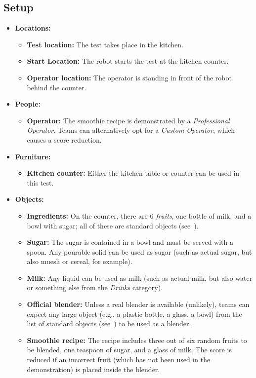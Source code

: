 \subsection*{Setup}
\begin{itemize}[nosep]
    \item \textbf{Locations:}
        \begin{itemize}
            \item \textbf{Test location:} The test takes place in the kitchen.
            \item \textbf{Start Location:} The robot starts the test at the kitchen counter.
            \item \textbf{Operator location:} The operator is standing in front of the robot behind the counter.
        \end{itemize}
    \item \textbf{People:}
        \begin{itemize}
            \item \textbf{Operator:} The smoothie recipe is demonstrated by a \emph{Professional Operator}. Teams can alternatively opt for a \emph{Custom Operator}, which causes a score reduction.
        \end{itemize}
    \item \textbf{Furniture:}
	    \begin{itemize}
            \item \textbf{Kitchen counter:} Either the kitchen table or counter can be used in this test.
        \end{itemize}
    \item \textbf{Objects:}
        \begin{itemize}
            \item \textbf{Ingredients:} On the counter, there are 6 \emph{fruits}, one bottle of milk, and a bowl with sugar; all of these are standard objects (see~).
            \item \textbf{Sugar:} The sugar is contained in a bowl and must be served with a spoon. Any pourable solid can be used as sugar (such as actual sugar, but also muesli or cereal, for example).
            \item \textbf{Milk:} Any liquid can be used as milk (such as actual milk, but also water or something else from the \emph{Drinks} category).
            \item \textbf{Official blender:} Unless a real blender is available (unlikely), teams can expect any large object (e.g., a plastic bottle, a glass, a bowl) from the list of standard objects (see~) to be used as a blender.
            \item \textbf{Smoothie recipe:} The recipe includes three out of six random fruits to be blended, one teaspoon of sugar, and a glass of milk.
			The score is reduced if an incorrect fruit (which has not been used in the demonstration) is placed inside the blender.
        \end{itemize}
\end{itemize}

